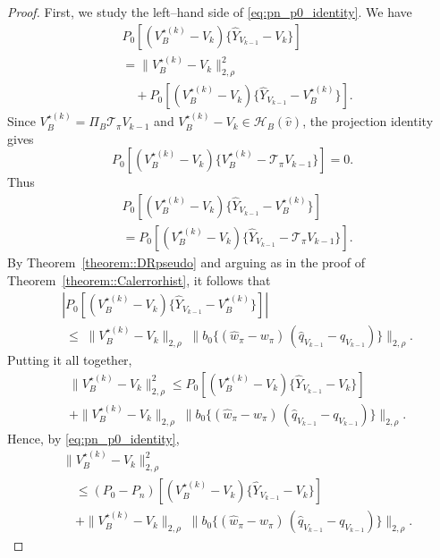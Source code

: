 \documentclass{article}
\theoremstyle{plain}
\theoremstyle{definition}
\theoremstyle{remark}
\begin{document}
\begin{proof}
First, we study the left–hand side of
\eqref{eq:pn_p0_identity}. We have
\begin{align*}
    & P_0\left[
  (V_B^{\star(k)} - V_k)
  \Big\{
    \widehat Y_{V_{k-1}}
    - V_k
  \Big\}
\right]\\
& = \|V_B^{\star(k)} - V_k\|_{2,\rho}^2\\
& \quad + P_0\left[
  (V_B^{\star(k)} - V_k)
  \Big\{
    \widehat Y_{V_{k-1}}
    - V_B^{\star(k)}
  \Big\}
\right].
\end{align*}
Since \(V_B^{\star(k)}=\Pi_B\mathcal T_\pi V_{k-1}\) and
\(V_B^{\star(k)}-V_k\in\mathcal H_B(\hat v)\), the projection identity
gives
\[
P_0\left[
  (V_B^{\star(k)}-V_k)
  \{V_B^{\star(k)}-\mathcal T_\pi V_{k-1}\}
\right]=0.
\]
Thus
\begin{align*}
& P_0\left[
  (V_B^{\star(k)} - V_k)
  \Big\{
    \widehat Y_{V_{k-1}}
    - V_B^{\star(k)}
  \Big\}
\right] \\[0.4em]
&=
P_0\left[
  (V_B^{\star(k)} - V_k)
  \Big\{
    \widehat Y_{V_{k-1}}
    - \mathcal T_{\pi}V_{k-1}
  \Big\}
\right].
\end{align*}
By Theorem~\ref{theorem::DRpseudo} and arguing as in the proof of
Theorem~\ref{theorem::Calerrorhist}, it follows that
\begin{align*}
&\left|
P_0\left[
  (V_B^{\star(k)} - V_k)
  \Big\{
    \widehat Y_{V_{k-1}}
    - V_B^{\star(k)}
  \Big\}
\right]
\right|\\
&\;\le\;
\|V_B^{\star(k)} - V_k\|_{2,\rho}\;
\big\|
b_0\{(\widehat w_{\pi} - w_{\pi})\,
(\widehat q_{V_{k-1}} - q_{V_{k-1}})\}
\big\|_{2,\rho}.
\end{align*}
Putting it all together,
\begin{align*}
&\|V_B^{\star(k)} - V_k\|_{2,\rho}^2
 \leq
P_0\left[
  (V_B^{\star(k)} - V_k)
  \Big\{
    \widehat Y_{V_{k-1}}
    - V_k
  \Big\}
\right] \\
&+ 
\|V_B^{\star(k)} - V_k\|_{2,\rho}\;
\big\|
b_0\{(\widehat w_{\pi} - w_{\pi})\,
(\widehat q_{V_{k-1}} - q_{V_{k-1}})\}
\big\|_{2,\rho}.
\end{align*}
Hence, by \eqref{eq:pn_p0_identity},
\begin{equation}
\begin{aligned}
&\|V_B^{\star(k)} - V_k\|_{2,\rho}^2 \\
& \quad \leq
(P_0 - P_n)\left[
  (V_B^{\star(k)} - V_k)
  \Big\{
    \widehat Y_{V_{k-1}}
    - V_k
  \Big\}
\right]\\
& \quad + 
\|V_B^{\star(k)} - V_k\|_{2,\rho}\;
\big\|
b_0\{(\widehat w_{\pi} - w_{\pi})\,
(\widehat q_{V_{k-1}} - q_{V_{k-1}})\}
\big\|_{2,\rho}.
\end{aligned}
\label{eq:pn_p0_identity2}
\end{equation}



\end{proof}
\end{document}
